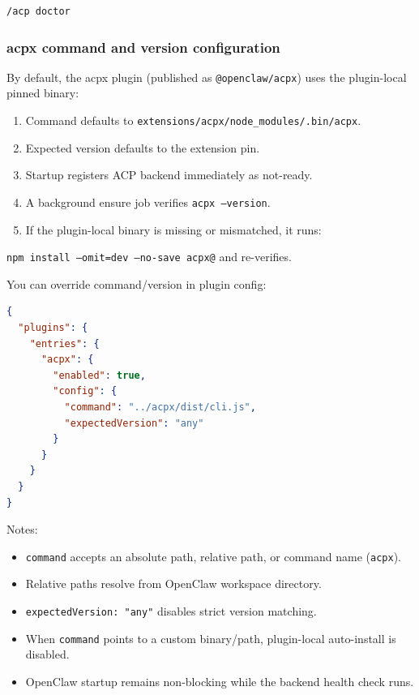 \begin{lstlisting}
/acp doctor
\end{lstlisting}


\subsubsection{acpx command and version configuration}


By default, the acpx plugin (published as \texttt{@openclaw/acpx}) uses the plugin-local pinned binary:

\begin{enumerate}
  \item Command defaults to \texttt{extensions/acpx/node\_modules/.bin/acpx}.
  \item Expected version defaults to the extension pin.
  \item Startup registers ACP backend immediately as not-ready.
  \item A background ensure job verifies \texttt{acpx --version}.
  \item If the plugin-local binary is missing or mismatched, it runs:
\end{enumerate}

\texttt{npm install --omit=dev --no-save acpx@} and re-verifies.

You can override command/version in plugin config:

\begin{lstlisting}[language=json]
{
  "plugins": {
    "entries": {
      "acpx": {
        "enabled": true,
        "config": {
          "command": "../acpx/dist/cli.js",
          "expectedVersion": "any"
        }
      }
    }
  }
}
\end{lstlisting}


Notes:

\begin{itemize}
  \item \texttt{command} accepts an absolute path, relative path, or command name (\texttt{acpx}).
  \item Relative paths resolve from OpenClaw workspace directory.
  \item \texttt{expectedVersion: "any"} disables strict version matching.
  \item When \texttt{command} points to a custom binary/path, plugin-local auto-install is disabled.
  \item OpenClaw startup remains non-blocking while the backend health check runs.
\end{itemize}


